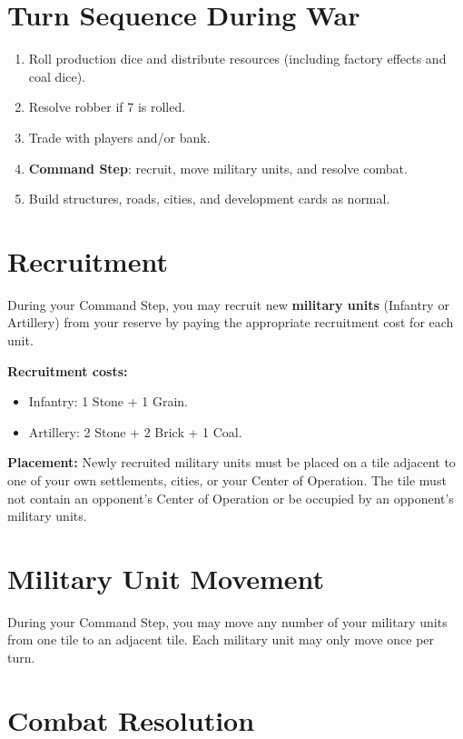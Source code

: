 \documentclass[12pt]{report}
\begin{document}
\section{Turn Sequence During War}

\begin{enumerate}[leftmargin=1.2cm]
  \item Roll production dice and distribute resources (including factory effects and coal dice).
  \item Resolve robber if 7 is rolled.
  \item Trade with players and/or bank.
  \item \textbf{Command Step}: recruit, move military units, and resolve combat.
  \item Build structures, roads, cities, and development cards as normal.
\end{enumerate}

\section{Recruitment}
During your Command Step, you may recruit new \textbf{military units} (Infantry or Artillery) from your reserve by paying the appropriate recruitment cost for each unit.

\textbf{Recruitment costs:}
\begin{itemize}[leftmargin=1.2cm]
  \item Infantry: 1 Stone + 1 Grain.
  \item Artillery: 2 Stone + 2 Brick + 1 Coal.
\end{itemize}

\textbf{Placement:}
Newly recruited military units must be placed on a tile adjacent to one of your own settlements, cities, or your Center of Operation. The tile must not contain an opponent's Center of Operation or be occupied by an opponent's military units.

\section{Military Unit Movement}
During your Command Step, you may move any number of your military units from one tile to an adjacent tile. Each military unit may only move once per turn.

\section{Combat Resolution}
\end{document}
